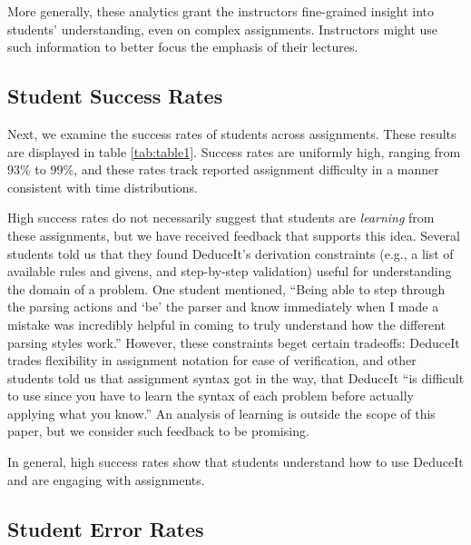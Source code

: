\documentclass{sigchi}
\newcommand{\msb}[1]{\textbf{\textcolor{cyan}{Michael: #1}}}
\begin{document}
More generally, these analytics grant the instructors fine-grained insight into students' understanding, even on complex assignments. Instructors might use such information to better focus the emphasis of their lectures.

\subsection{Student Success Rates}

Next, we examine the success rates of students across assignments. These results are displayed in table \ref{tab:table1}. Success rates are uniformly high, ranging from $93\%$ to $99\%$, and these rates track reported assignment difficulty in a manner consistent with time distributions. %

High success rates do not necessarily suggest that students are \textit{learning} from these assignments, but we have received feedback that supports this idea. Several students told us that they found DeduceIt's derivation constraints (e.g., a list of available rules and givens, and step-by-step validation) useful for understanding the domain of a problem. One student mentioned, ``Being able to step through the parsing actions and `be' the parser and know immediately when I made a mistake was incredibly helpful in coming to truly understand how the different parsing styles work.'' However, these constraints beget certain tradeoffs: DeduceIt trades flexibility in assignment notation for ease of verification, and other students told us that assignment syntax got in the way, that DeduceIt ``is difficult to use since you have to learn the syntax of each problem before actually applying what you know.'' An analysis of learning is outside the scope of this paper, but we consider such feedback to be promising.

In general, high success rates show that students understand how to use DeduceIt and are engaging with assignments.

\subsection{Student Error Rates}
\end{document}

